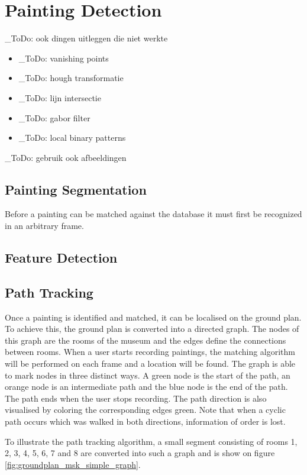 \documentclass[10pt,final,journal]{IEEEtran}
\newcommand{\todo}[1]{\color{red}\_ToDo: #1 \color{black}}
\begin{document}
	\section{Painting Detection}
	\todo{ook dingen uitleggen die niet werkte}
	\begin{itemize}
		\item \todo{vanishing points}
		\item \todo{hough transformatie}
		\item \todo{lijn intersectie}
		\item \todo{gabor filter}
		\item \todo{local binary patterns}
	\end{itemize}

	\todo{gebruik ook afbeeldingen}
	
	\subsection{Painting Segmentation}
	Before a painting can be matched against the database it must first be recognized in an arbitrary frame. 
	
	\subsection{Feature Detection}
	
	
	\subsection{Path Tracking}
	Once a painting is identified and matched, it can be localised on the ground plan. To achieve this, the ground plan is converted into a directed graph. The nodes of this graph are the rooms of the museum and the edges define the connections between rooms. When a user starts recording paintings, the matching algorithm will be performed on each frame and a location will be found. The graph is able to mark nodes in three distinct ways. A green node is the start of the path, an orange node is an intermediate path and the blue node is the end of the path. The path ends when the user stops recording. The path direction is also visualised by coloring the corresponding edges green. Note that when a cyclic path occurs which was walked in both directions, information of order is lost.
	
	
	
	
	To illustrate the path tracking algorithm,  a small segment consisting of rooms 1, 2, 3, 4, 5, 6, 7 and 8 are converted into such a graph and is show on figure \ref{fig:groundplan_msk_simple_graph}.
	
\end{document}
